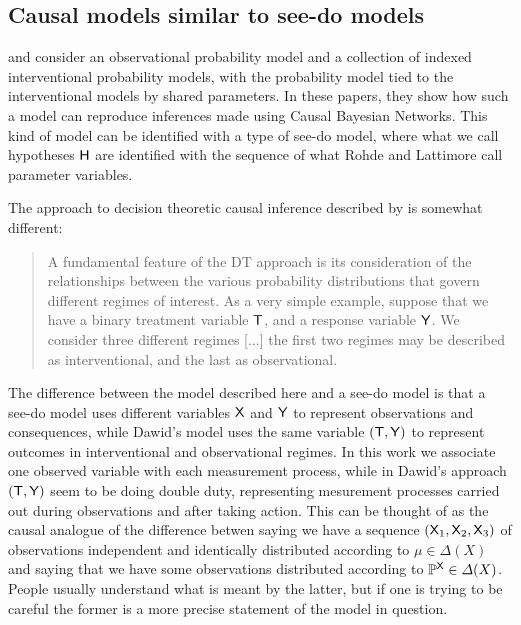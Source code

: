 
\subsection{Causal models similar to see-do models}

\citet{lattimore_causal_2019} and \citet{lattimore_replacing_2019} consider an observational probability model and a collection of indexed interventional probability models, with the probability model tied to the interventional models by shared parameters. In these papers, they show how such a model can reproduce inferences made using Causal Bayesian Networks. This kind of model can be identified with a type of see-do model, where what we call hypotheses $\mathsf{H}$ are identified with the sequence of what Rohde and Lattimore call parameter variables.

The approach to decision theoretic causal inference described by \citet{dawid_decision-theoretic_2020} is somewhat different:

\begin{quote}
A fundamental feature of the DT approach is its consideration of the relationships between the various probability distributions that govern different regimes of interest. As a very simple example, suppose that we have a binary treatment variable $\mathsf{T}$, and a response variable $\mathsf{Y}$. We consider three different regimes [...] the first two regimes may be described as interventional, and the last as observational.
\end{quote}

The difference between the model described here and a see-do model is that a see-do model uses different variables $\mathsf{X}$ and $\mathsf{Y}$ to represent observations and consequences, while Dawid's model uses the same variable $(\mathsf{T},\mathsf{Y})$ to represent outcomes in interventional and observational regimes. In this work we associate one observed variable with each measurement process, while in Dawid's approach $(\mathsf{T},\mathsf{Y})$ seem to be doing double duty, representing mesurement processes carried out during observations and after taking action. This can be thought of as the causal analogue of the difference betwen saying we have a sequence $(\mathsf{X}_1,\mathsf{X}_2,\mathsf{X}_3)$ of observations independent and identically distributed according to $\mu\in \Delta(X)$ and saying that we have some observations distributed according to $\mathbb{P}^{\mathsf{X}}\in \Delta(X)$. People usually understand what is meant by the latter, but if one is trying to be careful the former is a more precise statement of the model in question.

